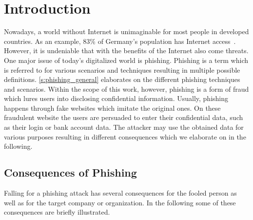\section{Introduction}
\label{s:introduction}

Nowadays, a world without Internet is unimaginable for most people in developed countries.
As an example, 83\% of Germany's population has Internet access~\cite{globalfinance2012internetusage}. 
However, it is undeniable that with the benefits of the Internet also come threats. 
One major issue of today's digitalized world is phishing. 
Phishing is a term which is referred to for various scenarios and techniques resulting in multiple possible definitions.
\autoref{s:phishing_general} elaborates on the different phishing techniques and scenarios.
Within the scope of this work, however, phishing is a form of fraud which lures users into disclosing confidential information. 
Usually, phishing happens through fake websites which imitate the original ones.
On these fraudulent website the users are persuaded to enter their confidential data, such as their login or bank account data.
The attacker may use the obtained data for various purposes resulting in different consequences which we elaborate on in the following.

\subsection{Consequences of Phishing}
Falling for a phishing attack has several consequences for the fooled person as well as for the target company or organization.
In the following some of these consequences are briefly illustrated.

